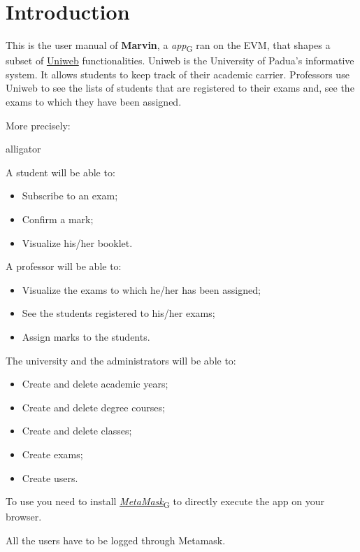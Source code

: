 \section{Introduction}
This is the user manual of \textbf{Marvin}, a \emph{\DH app}\textsubscript{G} ran on the EVM, that shapes a subset of \href{www.uniweb.unipd.it}{Uniweb} functionalities. Uniweb is the University of Padua's informative system.
It allows students to keep track of their academic carrier. Professors use Uniweb to see the lists of students that are registered to their exams and, see the exams to which they have been assigned.

More precisely:
\begin{labeling}{alligator}
	\item A student will be able to:
	\begin{itemize}
		\item Subscribe to an exam;
		\item Confirm a mark;%
		\item Visualize his/her booklet.
	\end{itemize}
	\item A professor will be able to:
	\begin{itemize}
		\item Visualize the exams to which he/her has been assigned;
		\item See the students registered to his/her exams;
		\item Assign marks to the students.
	\end{itemize}
	\item The university and the administrators will be able to:
	\begin{itemize}
		\item Create and delete academic years;
		\item Create and delete degree courses;
		\item Create and delete classes;
		\item Create exams;
		\item Create users.
	\end{itemize}
\end{labeling}

To use \project{} you need to install \emph{\href{https://metamask.io/}{MetaMask}}\textsubscript{G} to directly execute the \DH app on your browser.

All the users have to be logged through Metamask.